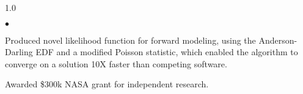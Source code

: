 \documentclass[margin,line, 12pt]{res}
\newenvironment{list2}{
  \begin{list}{$\bullet$}{%
      \setlength{\itemsep}{0.05in}
      \setlength{\parsep}{0in} \setlength{\parskip}{0in}
      \setlength{\topsep}{0.0in} \setlength{\partopsep}{0in}
      \setlength{\leftmargin}{0.2in}}}{\end{list}}
\begin{document}
\begin{spacing}{1.0}
\begin{resume}
\begin{list2}
	\item Produced novel likelihood function for forward modeling, using the Anderson-Darling EDF and a modified Poisson statistic, which enabled the algorithm to converge on a solution 10X faster than competing software.    
	
	\item Awarded \$300k NASA grant for independent research.
	
      
    \end{list2}
\vspace*{-2mm}





\end{resume}
\end{spacing}
\end{document}
